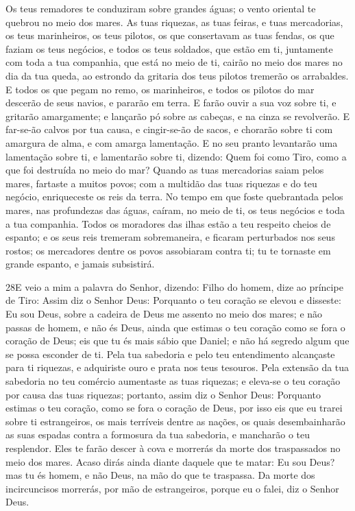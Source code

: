 Os teus remadores te conduziram sobre grandes águas; o vento
oriental te quebrou no meio dos mares. As tuas riquezas, as
tuas feiras, e tuas mercadorias, os teus marinheiros, os teus
pilotos, os que consertavam as tuas fendas, os que faziam os teus
negócios, e todos os teus soldados, que estão em ti, juntamente com
toda a tua companhia, que está no meio de ti, cairão no meio dos
mares no dia da tua queda, ao estrondo da gritaria dos teus
pilotos tremerão os arrabaldes. E todos os que pegam no remo,
os marinheiros, e todos os pilotos do mar descerão de seus navios, e
pararão em terra. E farão ouvir a sua voz sobre ti, e
gritarão amargamente; e lançarão pó sobre as cabeças, e na cinza se
revolverão. E far-se-ão calvos por tua causa, e cingir-se-ão
de sacos, e chorarão sobre ti com amargura de alma, e com amarga
lamentação. E no seu pranto levantarão uma lamentação sobre
ti, e lamentarão sobre ti, dizendo: Quem foi como Tiro, como a que
foi destruída no meio do mar? Quando as tuas mercadorias
saiam pelos mares, fartaste a muitos povos; com a multidão das tuas
riquezas e do teu negócio, enriqueceste os reis da terra. No
tempo em que foste quebrantada pelos mares, nas profundezas das
águas, caíram, no meio de ti, os teus negócios e toda a tua
companhia. Todos os moradores das ilhas estão a teu respeito
cheios de espanto; e os seus reis tremeram sobremaneira, e ficaram
perturbados nos seus rostos; os mercadores dentre os povos
assobiaram contra ti; tu te tornaste em grande espanto, e jamais
subsistirá.

\medskip

\lettrine{28} E veio a mim a palavra do Senhor, dizendo:
Filho do homem, dize ao príncipe de Tiro: Assim diz o Senhor
Deus: Porquanto o teu coração se elevou e disseste: Eu sou Deus,
sobre a cadeira de Deus me assento no meio dos mares; e não passas
de homem, e não és Deus, ainda que estimas o teu coração como se
fora o coração de Deus; eis que tu és mais sábio que Daniel; e
não há segredo algum que se possa esconder de ti. Pela tua
sabedoria e pelo teu entendimento alcançaste para ti riquezas, e
adquiriste ouro e prata nos teus tesouros. Pela extensão da tua
sabedoria no teu comércio aumentaste as tuas riquezas; e eleva-se o
teu coração por causa das tuas riquezas; portanto, assim diz o
Senhor Deus: Porquanto estimas o teu coração, como se fora o coração
de Deus, por isso eis que eu trarei sobre ti estrangeiros, os
mais terríveis dentre as nações, os quais desembainharão as suas
espadas contra a formosura da tua sabedoria, e mancharão o teu
resplendor. Eles te farão descer à cova e morrerás da morte dos
traspassados no meio dos mares. Acaso dirás ainda diante daquele
que te matar: Eu sou Deus? mas tu és homem, e não Deus, na mão do
que te traspassa. Da morte dos incircuncisos morrerás, por
mão de estrangeiros, porque eu o falei, diz o Senhor Deus.

